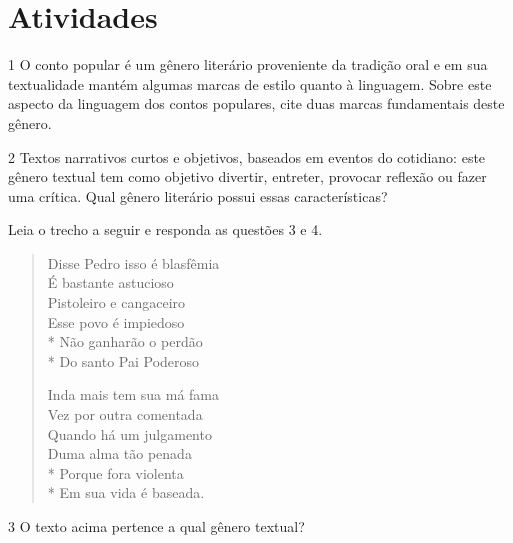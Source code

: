 \section{Atividades}

\num{1} O conto popular é um gênero literário proveniente da tradição oral e em sua textualidade mantém algumas marcas de estilo quanto à linguagem. Sobre este aspecto da linguagem dos contos populares, cite duas marcas fundamentais deste gênero.


\num{2} Textos narrativos curtos e objetivos, baseados em eventos do cotidiano: este gênero textual tem como objetivo divertir, entreter, provocar reflexão ou fazer uma crítica. Qual gênero literário possui essas características?


Leia o trecho a seguir e responda as questões 3 e 4.

\begin{verse}

Disse Pedro isso é blasfêmia \\
É bastante astucioso \\
Pistoleiro e cangaceiro \\ 
Esse povo é impiedoso \\*
Não ganharão o perdão \\*
Do santo Pai Poderoso 


Inda mais tem sua má fama \\
Vez por outra comentada \\
Quando há um julgamento \\
Duma alma tão penada \\*
Porque fora violenta \\*
Em sua vida é baseada. 

\end{verse}


\num{3} O texto acima pertence a qual gênero textual?


